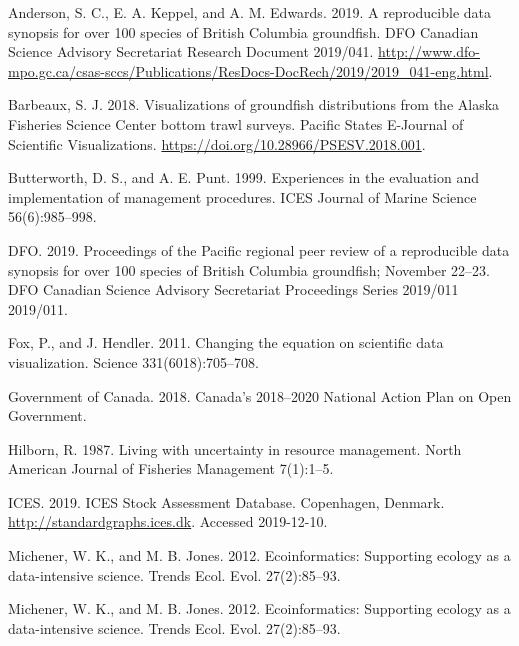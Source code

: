 \documentclass[12pt,]{article}
\newenvironment{CSLReferences}%
{\setlength{\parindent}{0pt}%
\everypar{\setlength{\hangindent}{\cslhangindent}}\ignorespaces}%
{\par}
\newlength{\cslhangindent}
\begin{document}
\hypertarget{refs}{}
\begin{CSLReferences}
\leavevmode\hypertarget{ref-anderson2019synopsis}{}%
Anderson, S. C., E. A. Keppel, and A. M. Edwards. 2019. A reproducible data synopsis for over 100 species of {British Columbia} groundfish. DFO Canadian Science Advisory Secretariat Research Document 2019/041. \url{http://www.dfo-mpo.gc.ca/csas-sccs/Publications/ResDocs-DocRech/2019/2019_041-eng.html}.

\leavevmode\hypertarget{ref-barbeaux2018}{}%
Barbeaux, S. J. 2018. {Visualizations of groundfish distributions from the Alaska Fisheries Science Center bottom trawl surveys}. Pacific States E-Journal of Scientific Visualizations. \url{https://doi.org/10.28966/PSESV.2018.001}.

\leavevmode\hypertarget{ref-butterworth1999}{}%
Butterworth, D. S., and A. E. Punt. 1999. Experiences in the evaluation and implementation of management procedures. ICES Journal of Marine Science 56(6):985--998.

\leavevmode\hypertarget{ref-dfo2019synopsis}{}%
DFO. 2019. Proceedings of the {Pacific} regional peer review of a reproducible data synopsis for over 100 species of {British Columbia} groundfish; {November} 22--23. DFO Canadian Science Advisory Secretariat Proceedings Series 2019/011 2019/011.

\leavevmode\hypertarget{ref-fox2011}{}%
Fox, P., and J. Hendler. 2011. Changing the equation on scientific data visualization. Science 331(6018):705--708.

\leavevmode\hypertarget{ref-canada2018}{}%
Government of Canada. 2018. {Canada's 2018--2020 National Action Plan on Open Government}.

\leavevmode\hypertarget{ref-hilborn1987}{}%
Hilborn, R. 1987. Living with uncertainty in resource management. North American Journal of Fisheries Management 7(1):1--5.

\leavevmode\hypertarget{ref-ices2019}{}%
ICES. 2019. {ICES Stock Assessment Database. Copenhagen, Denmark. \url{http://standardgraphs.ices.dk}. Accessed 2019-12-10.}

\leavevmode\hypertarget{ref-michener2012}{}%
Michener, W. K., and M. B. Jones. 2012. Ecoinformatics: Supporting ecology as a data-intensive science. Trends Ecol. Evol. 27(2):85--93.

\leavevmode\hypertarget{ref-michener2012}{}%
Michener, W. K., and M. B. Jones. 2012. Ecoinformatics: Supporting ecology as a data-intensive science. Trends Ecol. Evol. 27(2):85--93.


\end{CSLReferences}
\end{document}
